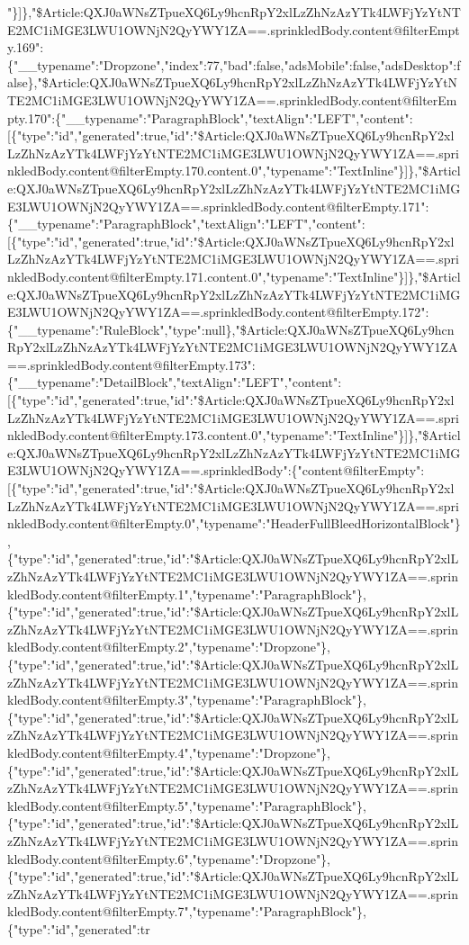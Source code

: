 "\}{]}\},"\$Article:QXJ0aWNsZTpueXQ6Ly9hcnRpY2xlLzZhNzAzYTk4LWFjYzYtNTE2MC1iMGE3LWU1OWNjN2QyYWY1ZA==.sprinkledBody.content@filterEmpty.169":\{"\_\_typename":"Dropzone","index":77,"bad":false,"adsMobile":false,"adsDesktop":false\},"\$Article:QXJ0aWNsZTpueXQ6Ly9hcnRpY2xlLzZhNzAzYTk4LWFjYzYtNTE2MC1iMGE3LWU1OWNjN2QyYWY1ZA==.sprinkledBody.content@filterEmpty.170":\{"\_\_typename":"ParagraphBlock","textAlign":"LEFT","content":{[}\{"type":"id","generated":true,"id":"\$Article:QXJ0aWNsZTpueXQ6Ly9hcnRpY2xlLzZhNzAzYTk4LWFjYzYtNTE2MC1iMGE3LWU1OWNjN2QyYWY1ZA==.sprinkledBody.content@filterEmpty.170.content.0","typename":"TextInline"\}{]}\},"\$Article:QXJ0aWNsZTpueXQ6Ly9hcnRpY2xlLzZhNzAzYTk4LWFjYzYtNTE2MC1iMGE3LWU1OWNjN2QyYWY1ZA==.sprinkledBody.content@filterEmpty.171":\{"\_\_typename":"ParagraphBlock","textAlign":"LEFT","content":{[}\{"type":"id","generated":true,"id":"\$Article:QXJ0aWNsZTpueXQ6Ly9hcnRpY2xlLzZhNzAzYTk4LWFjYzYtNTE2MC1iMGE3LWU1OWNjN2QyYWY1ZA==.sprinkledBody.content@filterEmpty.171.content.0","typename":"TextInline"\}{]}\},"\$Article:QXJ0aWNsZTpueXQ6Ly9hcnRpY2xlLzZhNzAzYTk4LWFjYzYtNTE2MC1iMGE3LWU1OWNjN2QyYWY1ZA==.sprinkledBody.content@filterEmpty.172":\{"\_\_typename":"RuleBlock","type":null\},"\$Article:QXJ0aWNsZTpueXQ6Ly9hcnRpY2xlLzZhNzAzYTk4LWFjYzYtNTE2MC1iMGE3LWU1OWNjN2QyYWY1ZA==.sprinkledBody.content@filterEmpty.173":\{"\_\_typename":"DetailBlock","textAlign":"LEFT","content":{[}\{"type":"id","generated":true,"id":"\$Article:QXJ0aWNsZTpueXQ6Ly9hcnRpY2xlLzZhNzAzYTk4LWFjYzYtNTE2MC1iMGE3LWU1OWNjN2QyYWY1ZA==.sprinkledBody.content@filterEmpty.173.content.0","typename":"TextInline"\}{]}\},"\$Article:QXJ0aWNsZTpueXQ6Ly9hcnRpY2xlLzZhNzAzYTk4LWFjYzYtNTE2MC1iMGE3LWU1OWNjN2QyYWY1ZA==.sprinkledBody":\{"content@filterEmpty":{[}\{"type":"id","generated":true,"id":"\$Article:QXJ0aWNsZTpueXQ6Ly9hcnRpY2xlLzZhNzAzYTk4LWFjYzYtNTE2MC1iMGE3LWU1OWNjN2QyYWY1ZA==.sprinkledBody.content@filterEmpty.0","typename":"HeaderFullBleedHorizontalBlock"\},\{"type":"id","generated":true,"id":"\$Article:QXJ0aWNsZTpueXQ6Ly9hcnRpY2xlLzZhNzAzYTk4LWFjYzYtNTE2MC1iMGE3LWU1OWNjN2QyYWY1ZA==.sprinkledBody.content@filterEmpty.1","typename":"ParagraphBlock"\},\{"type":"id","generated":true,"id":"\$Article:QXJ0aWNsZTpueXQ6Ly9hcnRpY2xlLzZhNzAzYTk4LWFjYzYtNTE2MC1iMGE3LWU1OWNjN2QyYWY1ZA==.sprinkledBody.content@filterEmpty.2","typename":"Dropzone"\},\{"type":"id","generated":true,"id":"\$Article:QXJ0aWNsZTpueXQ6Ly9hcnRpY2xlLzZhNzAzYTk4LWFjYzYtNTE2MC1iMGE3LWU1OWNjN2QyYWY1ZA==.sprinkledBody.content@filterEmpty.3","typename":"ParagraphBlock"\},\{"type":"id","generated":true,"id":"\$Article:QXJ0aWNsZTpueXQ6Ly9hcnRpY2xlLzZhNzAzYTk4LWFjYzYtNTE2MC1iMGE3LWU1OWNjN2QyYWY1ZA==.sprinkledBody.content@filterEmpty.4","typename":"Dropzone"\},\{"type":"id","generated":true,"id":"\$Article:QXJ0aWNsZTpueXQ6Ly9hcnRpY2xlLzZhNzAzYTk4LWFjYzYtNTE2MC1iMGE3LWU1OWNjN2QyYWY1ZA==.sprinkledBody.content@filterEmpty.5","typename":"ParagraphBlock"\},\{"type":"id","generated":true,"id":"\$Article:QXJ0aWNsZTpueXQ6Ly9hcnRpY2xlLzZhNzAzYTk4LWFjYzYtNTE2MC1iMGE3LWU1OWNjN2QyYWY1ZA==.sprinkledBody.content@filterEmpty.6","typename":"Dropzone"\},\{"type":"id","generated":true,"id":"\$Article:QXJ0aWNsZTpueXQ6Ly9hcnRpY2xlLzZhNzAzYTk4LWFjYzYtNTE2MC1iMGE3LWU1OWNjN2QyYWY1ZA==.sprinkledBody.content@filterEmpty.7","typename":"ParagraphBlock"\},\{"type":"id","generated":tr